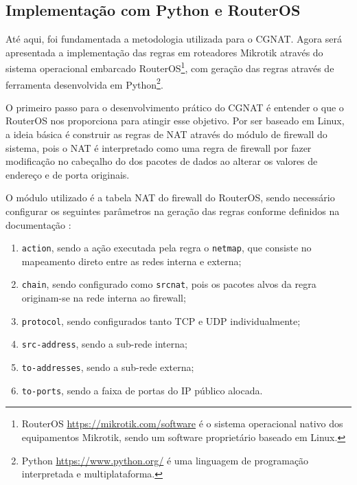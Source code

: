     \subsection{Implementação com Python e RouterOS}

    Até aqui, foi fundamentada a metodologia utilizada para o CGNAT. Agora será apresentada a implementação das regras em roteadores Mikrotik através do sistema operacional embarcado RouterOS\footnote{RouterOS \url{https://mikrotik.com/software} é o sistema operacional nativo dos equipamentos Mikrotik, sendo um software proprietário baseado em Linux.}, com geração das regras através de ferramenta desenvolvida em Python\footnote{Python \url{https://www.python.org/} é uma linguagem de programação interpretada e multiplataforma.}.
    
    O primeiro passo para o desenvolvimento prático do CGNAT é entender o que o RouterOS nos proporciona para atingir esse objetivo. Por ser baseado em Linux, a ideia básica é construir as regras de NAT através do módulo de firewall do sistema, pois o NAT é interpretado como uma regra de firewall por fazer modificação no cabeçalho do dos pacotes de dados ao alterar os valores de endereço e de porta originais.

    O módulo utilizado é a tabela NAT do firewall do RouterOS, sendo necessário configurar os seguintes parâmetros na geração das regras conforme definidos na documentação \cite{natmikrotik}:

    \begin{enumerate}[label=\alph*)]
        \item \label{nat:action} {\tt action}, sendo a ação executada pela regra o {\tt netmap}, que consiste no mapeamento direto entre as redes interna e externa;
        
        \item \label{nat:chain} {\tt chain}, sendo configurado como {\tt srcnat}, pois os pacotes alvos da regra originam-se na rede interna ao firewall; 
        
        \item \label{nat:protocol} {\tt protocol}, sendo configurados tanto TCP e UDP individualmente; 
        
        \item \label{nat:srcaddress} {\tt src-address}, sendo a sub-rede interna;
        
        \item \label{nat:toaddress} {\tt to-addresses}, sendo a sub-rede externa;
        
        \item \label{nat:toports} {\tt to-ports}, sendo a faixa de portas do IP público alocada.
    \end{enumerate}

